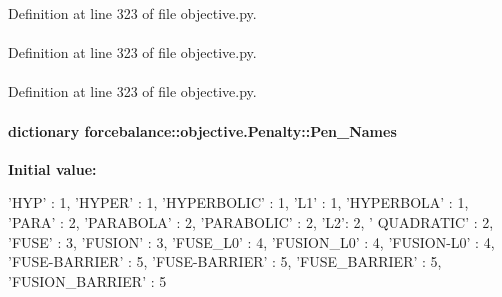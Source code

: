\-Definition at line 323 of file objective.\-py.

\hypertarget{classforcebalance_1_1objective_1_1Penalty_a1280094f47322c26c0ed2327d55d2bf9}{
\paragraph[{\-F\-F}]{}}\label{classforcebalance_1_1objective_1_1Penalty_a1280094f47322c26c0ed2327d55d2bf9}


\-Definition at line 323 of file objective.\-py.

\hypertarget{classforcebalance_1_1objective_1_1Penalty_a817fa1ce79cc4658d81e7e1d628dad00}{
\paragraph[{fmul}]{}}\label{classforcebalance_1_1objective_1_1Penalty_a817fa1ce79cc4658d81e7e1d628dad00}


\-Definition at line 323 of file objective.\-py.

\hypertarget{classforcebalance_1_1objective_1_1Penalty_aad5192e4b92742dbe94fceb4144cebf9}{
\paragraph[{\-Pen\-\_\-\-Names}]{\setlength{\rightskip}{0pt plus 5cm}dictionary {\bf forcebalance\-::objective.\-Penalty\-::\-Pen\-\_\-\-Names}}}\label{classforcebalance_1_1objective_1_1Penalty_aad5192e4b92742dbe94fceb4144cebf9}
{\bfseries \-Initial value\-:}
\begin{DoxyCode}
{'HYP' : 1, 'HYPER' : 1, 'HYPERBOLIC' : 1, 'L1' : 1, 'HYPERBOLA' : 1,
                      'PARA' : 2, 'PARABOLA' : 2, 'PARABOLIC' : 2, 'L2': 2, '
      QUADRATIC' : 2,
                      'FUSE' : 3, 'FUSION' : 3, 'FUSE_L0' : 4, 'FUSION_L0' : 4,
       'FUSION-L0' : 4,
                      'FUSE-BARRIER' : 5, 'FUSE-BARRIER' : 5, 'FUSE_BARRIER' : 
      5, 'FUSION_BARRIER' : 5}
\end{DoxyCode}


